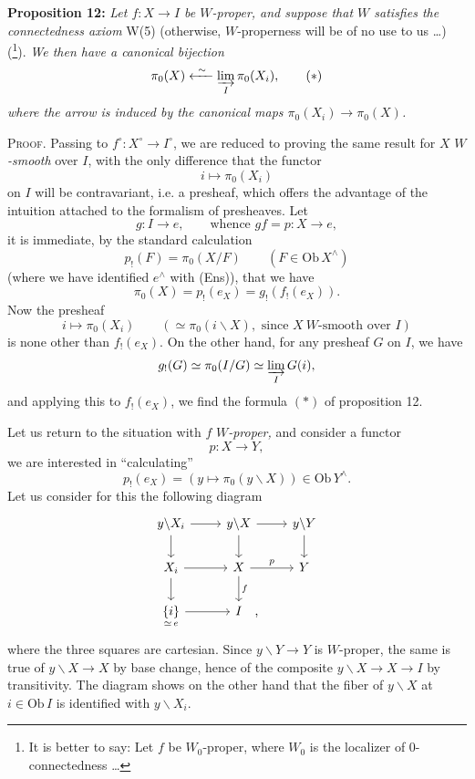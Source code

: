 \textbf{Proposition 12:} \textit{Let $f : X \longrightarrow I$ be $W$-proper, and suppose that $W$ satisfies the connectedness axiom} W(5) (otherwise, $W$-properness will be of no use to us \dots) (\footnote[81]{It is better to say: Let $f$ be $W_0$-proper, where $W_0$ is the localizer of 0-connectedness \dots}). \textit{We then have a canonical bijection}
\[
\pi_0(X) \xleftarrow{\ \sim\ } \varinjlim_{I} \pi_0(X_i), \tag*{$(*)$}
\]
\textit{where the arrow is induced by the canonical maps $\pi_0(X_i) \longrightarrow \pi_0(X)$.}

\textsc{Proof.} Passing to $f^\circ : X^\circ \longrightarrow I^\circ$, we are reduced to proving the same result for $X$ \textit{$W$-smooth} over $I$, with the only difference that the functor
\[
i \longmapsto \pi_0(X_i)
\]
on $I$ will be contravariant, i.e. a presheaf, which offers the advantage of the intuition attached to the formalism of presheaves. Let
\[
g : I \longrightarrow e, \qquad \text{whence } gf = p : X \longrightarrow e,
\]
it is immediate, by the standard calculation
\[
p_!(F) = \pi_0(X/F) \qquad (F \in \mathrm{Ob}\, X^\wedge)
\]
(where we have identified $e^\wedge$ with (Ens)), that we have
\[
\pi_0(X) = p_!(e_X) = g_!(f_!(e_X)).
\]
Now the presheaf
\[
i \longmapsto \pi_0(X_i) \qquad (\simeq \pi_0(i\backslash X), \text{ since } X\ W\text{-smooth over } I)
\]
is none other than $f_!(e_X)$. On the other hand, for any presheaf $G$ on $I$, we have
\[
g_!(G) \simeq \pi_0(I/G) \simeq \varinjlim_{I} G(i),
\]
and applying this to $f_!(e_X)$, we find the formula $(*)$ of proposition 12.

Let us return to the situation with $f$ \textit{$W$-proper,} and consider a functor
\[
p : X \longrightarrow Y,
\]
we are interested in ``calculating''
\[
p_!(e_X) = (y \longmapsto \pi_0(y\backslash X)) \in \mathrm{Ob}\, Y^\wedge.
\]
Let us consider for this the following diagram
\[
\begin{tikzcd}
y\backslash X_i \arrow[r] \arrow[d] & y\backslash X \arrow[r] \arrow[d] & y\backslash Y \arrow[d] \\
X_i \arrow[r] \arrow[d] & X \arrow[r, "p"] \arrow[d, "f"] & Y \\
\underset{\simeq\, e}{\{i\}} \arrow[r] & I\rlap{\quad ,} &
\end{tikzcd}
\]
where the three squares are cartesian. Since $y\backslash Y \longrightarrow Y$ is $W$-proper, the same is true of $y\backslash X \longrightarrow X$ by base change, hence of the composite $y\backslash X \longrightarrow X \longrightarrow I$ by transitivity. The diagram shows on the other hand that the fiber of $y\backslash X$ at $i \in \mathrm{Ob}\, I$ is identified with $y\backslash X_i$.

